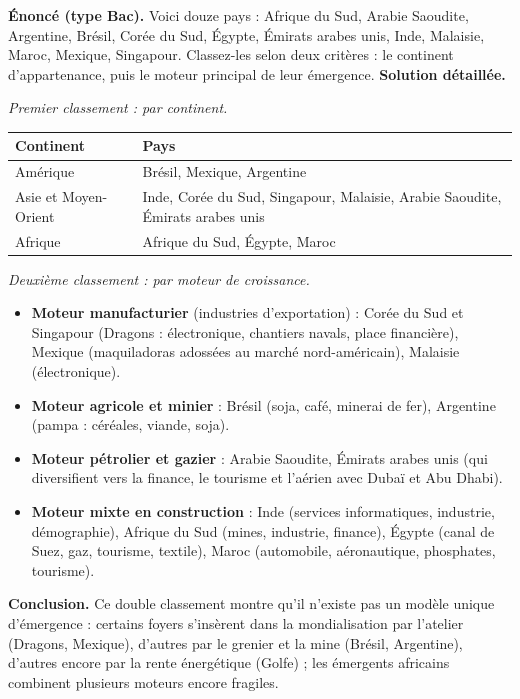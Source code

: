 \documentclass[11pt]{article}
\begin{document}
\begin{exoresolu}
\textbf{Énoncé (type Bac).} Voici douze pays : Afrique du Sud, Arabie Saoudite, Argentine, Brésil, Corée du Sud, Égypte, Émirats arabes unis, Inde, Malaisie, Maroc, Mexique, Singapour. Classez-les selon deux critères : le continent d'appartenance, puis le moteur principal de leur émergence.
\tcblower
\textbf{Solution détaillée.}

\emph{Premier classement : par continent.}
\begin{center}
\begin{tabularx}{\linewidth}{|l|X|}\hline
\rowcolor{popblueL} \textbf{Continent} & \textbf{Pays} \\ \hline
Amérique & Brésil, Mexique, Argentine \\ \hline
Asie et Moyen-Orient & Inde, Corée du Sud, Singapour, Malaisie, Arabie Saoudite, Émirats arabes unis \\ \hline
Afrique & Afrique du Sud, Égypte, Maroc \\ \hline
\end{tabularx}
\end{center}

\emph{Deuxième classement : par moteur de croissance.}
\begin{itemize}
\item \textbf{Moteur manufacturier} (industries d'exportation) : Corée du Sud et Singapour (Dragons : électronique, chantiers navals, place financière), Mexique (maquiladoras adossées au marché nord-américain), Malaisie (électronique).
\item \textbf{Moteur agricole et minier} : Brésil (soja, café, minerai de fer), Argentine (pampa : céréales, viande, soja).
\item \textbf{Moteur pétrolier et gazier} : Arabie Saoudite, Émirats arabes unis (qui diversifient vers la finance, le tourisme et l'aérien avec Dubaï et Abu Dhabi).
\item \textbf{Moteur mixte en construction} : Inde (services informatiques, industrie, démographie), Afrique du Sud (mines, industrie, finance), Égypte (canal de Suez, gaz, tourisme, textile), Maroc (automobile, aéronautique, phosphates, tourisme).
\end{itemize}

\textbf{Conclusion.} Ce double classement montre qu'il n'existe pas un modèle unique d'émergence : certains foyers s'insèrent dans la mondialisation par l'atelier (Dragons, Mexique), d'autres par le grenier et la mine (Brésil, Argentine), d'autres encore par la rente énergétique (Golfe) ; les émergents africains combinent plusieurs moteurs encore fragiles.
\end{exoresolu}
\end{document}
